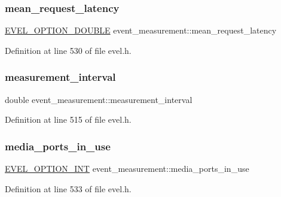 \subsubsection{\texorpdfstring{mean\+\_\+request\+\_\+latency}{mean\_request\_latency}}
{\footnotesize\ttfamily \hyperlink{evel_8h_aafc42b3cd9aca88804c3d413e4ccec06}{E\+V\+E\+L\+\_\+\+O\+P\+T\+I\+O\+N\+\_\+\+D\+O\+U\+B\+LE} event\+\_\+measurement\+::mean\+\_\+request\+\_\+latency}



Definition at line 530 of file evel.\+h.

\hypertarget{structevent__measurement_a50125c8776bfb0f86393c796b0b99bb2}{}\label{structevent__measurement_a50125c8776bfb0f86393c796b0b99bb2} 
\subsubsection{\texorpdfstring{measurement\+\_\+interval}{measurement\_interval}}
{\footnotesize\ttfamily double event\+\_\+measurement\+::measurement\+\_\+interval}



Definition at line 515 of file evel.\+h.

\hypertarget{structevent__measurement_a4d246f5b2272849271401fb5c9c0b3b0}{}\label{structevent__measurement_a4d246f5b2272849271401fb5c9c0b3b0} 
\subsubsection{\texorpdfstring{media\+\_\+ports\+\_\+in\+\_\+use}{media\_ports\_in\_use}}
{\footnotesize\ttfamily \hyperlink{evel_8h_a452d825778d1c2368a54b8f689a25ba7}{E\+V\+E\+L\+\_\+\+O\+P\+T\+I\+O\+N\+\_\+\+I\+NT} event\+\_\+measurement\+::media\+\_\+ports\+\_\+in\+\_\+use}



Definition at line 533 of file evel.\+h.

\hypertarget{structevent__measurement_aaf593d6c87242c0dffc5720887ce3444}{}\label{structevent__measurement_aaf593d6c87242c0dffc5720887ce3444} 
